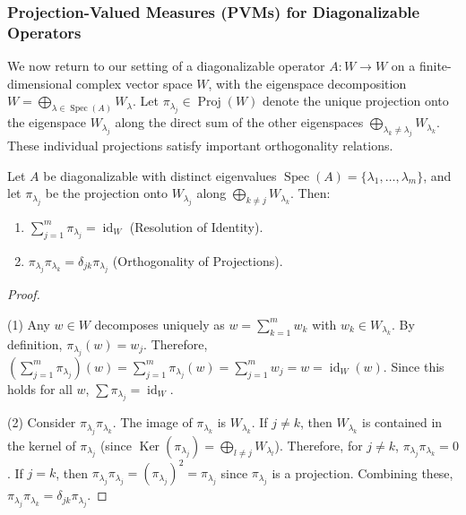 \subsubsection{Projection-Valued Measures (PVMs) for Diagonalizable Operators}
\label{subsec:pvm_def}

We now return to our setting of a diagonalizable operator $A: W \to W$ on a finite-dimensional complex vector space $W$, with the eigenspace decomposition $W = \bigoplus_{\lambda \in \operatorname{Spec}(A)} W_{\lambda}$. Let $\pi_{\lambda_j} \in \operatorname{Proj}(W)$ denote the unique projection onto the eigenspace $W_{\lambda_j}$ along the direct sum of the other eigenspaces $\bigoplus_{\lambda_k \neq \lambda_j} W_{\lambda_k}$. These individual projections satisfy important orthogonality relations.

\begin{lemma}
\label{lemma:eig_proj_props}
Let $A$ be diagonalizable with distinct eigenvalues $\operatorname{Spec}(A) = \{\lambda_1, \dots, \lambda_m\}$, and let $\pi_{\lambda_j}$ be the projection onto $W_{\lambda_j}$ along $\bigoplus_{k \neq j} W_{\lambda_k}$. Then:
\begin{enumerate}
    \item $\sum_{j=1}^m \pi_{\lambda_j} = \operatorname{id}_W$ (Resolution of Identity).
    \item $\pi_{\lambda_j} \pi_{\lambda_k} = \delta_{jk} \pi_{\lambda_j}$ (Orthogonality of Projections).
\end{enumerate}
\end{lemma}
\begin{proof}\,

(1) Any $w \in W$ decomposes uniquely as $w = \sum_{k=1}^m w_k$ with $w_k \in W_{\lambda_k}$. By definition, $\pi_{\lambda_j}(w) = w_j$. Therefore, $(\sum_{j=1}^m \pi_{\lambda_j})(w) = \sum_{j=1}^m \pi_{\lambda_j}(w) = \sum_{j=1}^m w_j = w = \operatorname{id}_W(w)$. Since this holds for all $w$, $\sum \pi_{\lambda_j} = \operatorname{id}_W$.

(2) Consider $\pi_{\lambda_j} \pi_{\lambda_k}$. The image of $\pi_{\lambda_k}$ is $W_{\lambda_k}$. If $j \neq k$, then $W_{\lambda_k}$ is contained in the kernel of $\pi_{\lambda_j}$ (since $\operatorname{Ker}(\pi_{\lambda_j}) = \bigoplus_{l \neq j} W_{\lambda_l}$). Therefore, for $j \neq k$, $\pi_{\lambda_j} \pi_{\lambda_k} = 0$. If $j = k$, then $\pi_{\lambda_j} \pi_{\lambda_j} = (\pi_{\lambda_j})^2 = \pi_{\lambda_j}$ since $\pi_{\lambda_j}$ is a projection. Combining these, $\pi_{\lambda_j} \pi_{\lambda_k} = \delta_{jk} \pi_{\lambda_j}$.
\end{proof}

